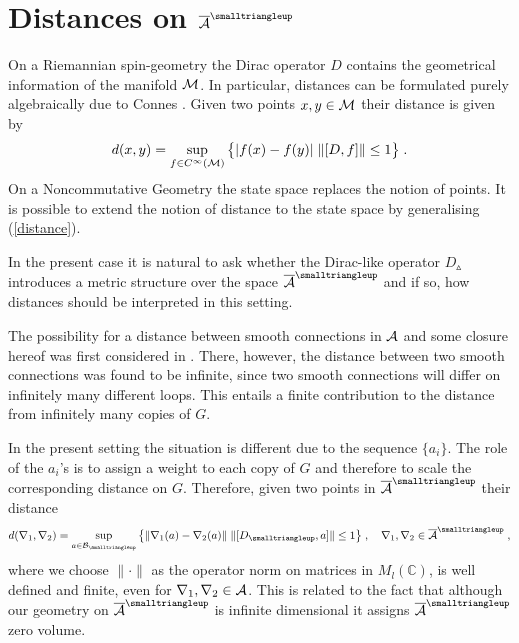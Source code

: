\documentclass[12pt]{article}
\newcommand{\ba}{\begin{eqnarray}}
\newcommand{\ea}{\end{eqnarray}}
\def\ca{{\cal A}}
\def\cb{{\cal B}}
\def\cm{{\cal M}}
\begin{document}
 












\section{Distances on $\overline{\ca}^{\smalltriangleup}$}
\label{DISTa}

On a Riemannian spin-geometry the Dirac operator $D$ contains the geometrical information of the manifold $\cm$. In particular, distances can be formulated purely algebraically due to Connes \cite{ConnesBook}. Given two points $x,y\in\cm$ their distance is given by
\ba
d(x,y)=\sup_{f\in C^{\infty}(\cm)}\big\{ |f(x)-f(y)|\; \| [D,f] \| \leq 1  \big\}\;.
\label{distance}
\ea
On a Noncommutative Geometry the state space replaces the notion of points. It is possible to extend the notion of distance to the state space by generalising (\ref{distance}).

In the present case it is natural to ask whether the Dirac-like operator $D_{\smalltriangleup}$ introduces a metric structure over the space $\overline{\ca}^{\smalltriangleup}$ and if so, how distances should be interpreted in this setting.

The possibility for a distance between smooth connections in $\ca$ and some closure hereof was first considered in \cite{Aastrup:2005yk}. There, however, the distance between two smooth connections was found to be infinite, since two smooth connections will differ on infinitely many different loops. This entails a finite contribution to the distance from infinitely many copies of $G$. 


In the present setting the situation is different due to the sequence $\{a_i\}$. The role of the $a_i$'s is to assign a weight to each copy of $G$ and therefore to scale the corresponding distance on $G$. Therefore, given two points in $\overline{\ca}^{\smalltriangleup}$ their distance  
\ba
d(\nabla_1,\nabla_2)=\sup_{a\in\cb_{\smalltriangleup}}\big\{  \|\nabla_1(a)-\nabla_2(a)\|\; \| [D_{\smalltriangleup},a]\|\leq 1 \big\}\;,\quad\nabla_1,\nabla_2\in\overline{\ca}^{\smalltriangleup}\;,
\label{diSt}
\ea
where we choose $\|\cdot\|$ as the operator norm on matrices in $M_l(\mathbb{C})$, is well defined and finite, even for $\nabla_1,\nabla_2\in\ca$. This is related to the fact that although our geometry on $\overline{\ca}^{\smalltriangleup}$ is infinite dimensional it assigns $\overline{\ca}^{\smalltriangleup}$ zero volume.
\end{document}
